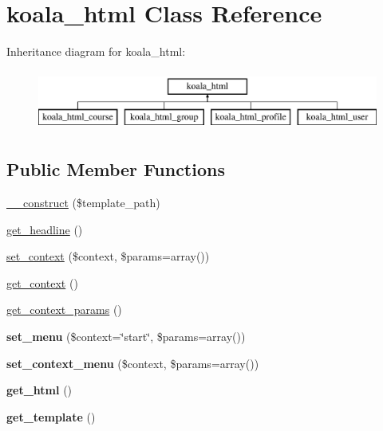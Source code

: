\hypertarget{classkoala__html}{
\section{koala\_\-html Class Reference}
\label{classkoala__html}
}
Inheritance diagram for koala\_\-html:\begin{figure}[H]
\begin{center}
\leavevmode
\includegraphics[height=2.000000cm]{classkoala__html}
\end{center}
\end{figure}
\subsection*{Public Member Functions}
\begin{DoxyCompactItemize}
\item 
\hyperlink{classkoala__html_af9264b278c4e19335da3652abccc575f}{\_\-\_\-construct} (\$template\_\-path)
\item 
\hyperlink{classkoala__html_a12af0cd17308d30b95d38e14dd5e82ec}{get\_\-headline} ()
\item 
\hyperlink{classkoala__html_a60cf8a0c199a50400ea876c238bdfa7b}{set\_\-context} (\$context, \$params=array())
\item 
\hyperlink{classkoala__html_a8e0248f588dbdb16ec7ad606deacaea7}{get\_\-context} ()
\item 
\hyperlink{classkoala__html_a486be7f4087cee7320236563ce037526}{get\_\-context\_\-params} ()
\item 
\hypertarget{classkoala__html_aef4a20f3212732f32a05b0a3b2d9e116}{
{\bfseries set\_\-menu} (\$context=\char`\"{}start\char`\"{}, \$params=array())}
\label{classkoala__html_aef4a20f3212732f32a05b0a3b2d9e116}

\item 
\hypertarget{classkoala__html_a9e4affc8a4438dc0bef1f1b40ac88653}{
{\bfseries set\_\-context\_\-menu} (\$context, \$params=array())}
\label{classkoala__html_a9e4affc8a4438dc0bef1f1b40ac88653}

\item 
\hypertarget{classkoala__html_a3101ea12ab38864d73d7d482db47ce20}{
{\bfseries get\_\-html} ()}
\label{classkoala__html_a3101ea12ab38864d73d7d482db47ce20}

\item 
\hypertarget{classkoala__html_aa28c590a2f839531b50e8912118febb6}{
{\bfseries get\_\-template} ()}
\label{classkoala__html_aa28c590a2f839531b50e8912118febb6}

\end{DoxyCompactItemize}
